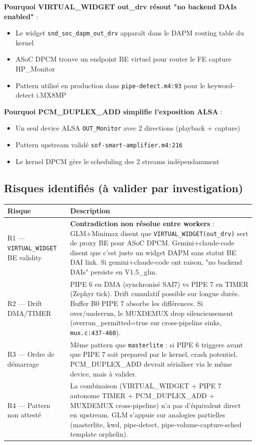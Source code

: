 \documentclass[11pt,a4paper]{article}
\begin{document}
\textbf{Pourquoi VIRTUAL\_WIDGET out\_drv résout "no backend DAIs enabled"} :
\begin{itemize}[leftmargin=*, itemsep=1pt]
  \item Le widget \texttt{snd\_soc\_dapm\_out\_drv} apparaît dans le DAPM routing table du kernel
  \item ASoC DPCM trouve un endpoint BE virtuel pour router le FE capture HP\_Monitor
  \item Pattern utilisé en production dans \texttt{pipe-detect.m4:93} pour le keyword-detect i.MX8MP
\end{itemize}

\textbf{Pourquoi PCM\_DUPLEX\_ADD simplifie l'exposition ALSA} :
\begin{itemize}[leftmargin=*, itemsep=1pt]
  \item Un seul device ALSA \texttt{OUT\_Monitor} avec 2 directions (playback + capture)
  \item Pattern upstream validé \texttt{sof-smart-amplifier.m4:216}
  \item Le kernel DPCM gère le scheduling des 2 streams indépendamment
\end{itemize}

\subsection{Risques identifiés (à valider par investigation)}

\begin{center}
\begin{tabularx}{\textwidth}{lX}
\toprule
\textbf{Risque} & \textbf{Description} \\
\midrule
R1 — \texttt{VIRTUAL\_WIDGET} BE validity & \textbf{Contradiction non résolue entre workers} : GLM+Minimax disent que \texttt{VIRTUAL\_WIDGET(out\_drv)} sert de proxy BE pour ASoC DPCM. Gemini+claude-code disent que c'est juste un widget DAPM sans statut BE DAI link. Si gemini+claude-code ont raison, "no backend DAIs" persiste en V1.5\_glm. \\
R2 — Drift DMA/TIMER & PIPE 6 en DMA (synchronisé SAI7) vs PIPE 7 en TIMER (Zephyr tick). Drift cumulatif possible sur longue durée. Buffer B0 PIPE 7 absorbe les différences. Si over/underrun, le MUXDEMUX drop silencieusement (overrun\_permitted=true sur cross-pipeline sinks, \texttt{mux.c:437-460}). \\
R3 — Ordre de démarrage & Même pattern que \texttt{masterlite} : si PIPE 6 triggere avant que PIPE 7 soit prepared par le kernel, crash potentiel. PCM\_DUPLEX\_ADD devrait sérialiser via le même device, mais à valider. \\
R4 — Pattern non attesté & La combinaison (VIRTUAL\_WIDGET + PIPE 7 autonome TIMER + PCM\_DUPLEX\_ADD + MUXDEMUX cross-pipeline) n'a pas d'équivalent direct en upstream. GLM s'appuie sur analogies partielles (masterlite, kwd, pipe-detect, pipe-volume-capture-sched template orphelin). \\
\bottomrule
\end{tabularx}
\end{center}
\end{document}
